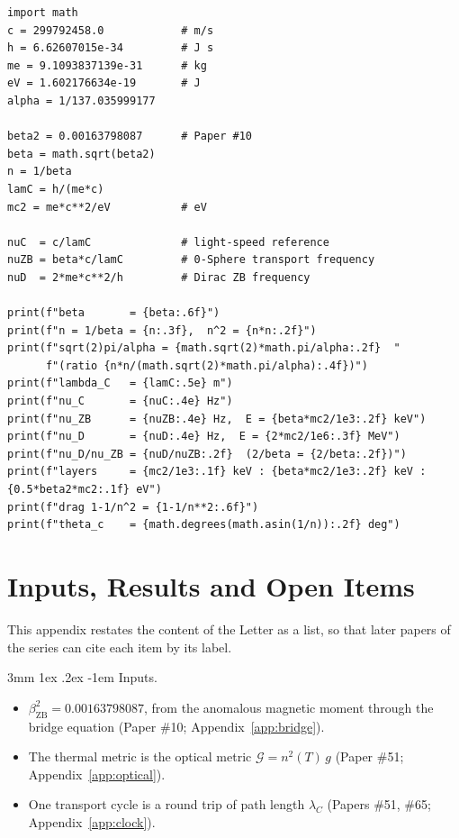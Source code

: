 \documentclass[%
 reprint, amsmath,amssymb, aps, prb, ]{revtex4-2}
\makeatletter
\numberwithin{equation}{section}
\renewcommand\paragraph{%
  \@startsection{paragraph}{4}{\z@}%
    {3mm \@plus 1ex \@minus .2ex}%
    {-1em}%
    {\normalfont\normalsize\itshape}}
\makeatother
\begin{document}
\begin{lstlisting}
import math
c = 299792458.0            # m/s
h = 6.62607015e-34         # J s
me = 9.1093837139e-31      # kg
eV = 1.602176634e-19       # J
alpha = 1/137.035999177

beta2 = 0.00163798087      # Paper #10
beta = math.sqrt(beta2)
n = 1/beta
lamC = h/(me*c)
mc2 = me*c**2/eV           # eV

nuC  = c/lamC              # light-speed reference
nuZB = beta*c/lamC         # 0-Sphere transport frequency
nuD  = 2*me*c**2/h         # Dirac ZB frequency

print(f"beta       = {beta:.6f}")
print(f"n = 1/beta = {n:.3f},  n^2 = {n*n:.2f}")
print(f"sqrt(2)pi/alpha = {math.sqrt(2)*math.pi/alpha:.2f}  "
      f"(ratio {n*n/(math.sqrt(2)*math.pi/alpha):.4f})")
print(f"lambda_C   = {lamC:.5e} m")
print(f"nu_C       = {nuC:.4e} Hz")
print(f"nu_ZB      = {nuZB:.4e} Hz,  E = {beta*mc2/1e3:.2f} keV")
print(f"nu_D       = {nuD:.4e} Hz,  E = {2*mc2/1e6:.3f} MeV")
print(f"nu_D/nu_ZB = {nuD/nuZB:.2f}  (2/beta = {2/beta:.2f})")
print(f"layers     = {mc2/1e3:.1f} keV : {beta*mc2/1e3:.2f} keV : {0.5*beta2*mc2:.1f} eV")
print(f"drag 1-1/n^2 = {1-1/n**2:.6f}")
print(f"theta_c    = {math.degrees(math.asin(1/n)):.2f} deg")
\end{lstlisting}

\section{Inputs, Results and Open Items}
\label{app:interface}

This appendix restates the content of the Letter as a list, so that later papers of the series can cite each item by its label.

\paragraph{Inputs.}
\begin{itemize}[leftmargin=2.4em]
\item[I1.] $\beta_{\text{ZB}}^2 = 0.00163798087$, from the anomalous magnetic moment through the bridge equation (Paper \#10; Appendix~\ref{app:bridge}).
\item[I2.] The thermal metric is the optical metric $\mathcal{G} = n^2(T)\,g$ (Paper \#51; Appendix~\ref{app:optical}).
\item[I3.] One transport cycle is a round trip of path length $\lambda_C$ (Papers \#51, \#65; Appendix~\ref{app:clock}).
\end{itemize}
\end{document}
